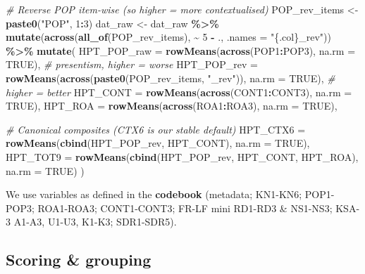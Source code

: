 \documentclass[
  10pt,
]{article}
\newenvironment{Shaded}{\begin{snugshade}}{\end{snugshade}}
\newcommand{\AttributeTok}[1]{\textcolor[rgb]{0.13,0.29,0.53}{#1}}
\newcommand{\CommentTok}[1]{\textcolor[rgb]{0.56,0.35,0.01}{\textit{#1}}}
\newcommand{\ConstantTok}[1]{\textcolor[rgb]{0.56,0.35,0.01}{#1}}
\newcommand{\DecValTok}[1]{\textcolor[rgb]{0.00,0.00,0.81}{#1}}
\newcommand{\FunctionTok}[1]{\textcolor[rgb]{0.13,0.29,0.53}{\textbf{#1}}}
\newcommand{\NormalTok}[1]{#1}
\newcommand{\OtherTok}[1]{\textcolor[rgb]{0.56,0.35,0.01}{#1}}
\newcommand{\SpecialCharTok}[1]{\textcolor[rgb]{0.81,0.36,0.00}{\textbf{#1}}}
\newcommand{\StringTok}[1]{\textcolor[rgb]{0.31,0.60,0.02}{#1}}
\begin{document}
\begin{Shaded}
\begin{Highlighting}[]
\CommentTok{\# Reverse POP item{-}wise (so higher = more contextualised)}
\NormalTok{POP\_rev\_items }\OtherTok{\textless{}{-}} \FunctionTok{paste0}\NormalTok{(}\StringTok{"POP"}\NormalTok{, }\DecValTok{1}\SpecialCharTok{:}\DecValTok{3}\NormalTok{)}
\NormalTok{dat\_raw }\OtherTok{\textless{}{-}}\NormalTok{ dat\_raw }\SpecialCharTok{\%\textgreater{}\%}
  \FunctionTok{mutate}\NormalTok{(}\FunctionTok{across}\NormalTok{(}\FunctionTok{all\_of}\NormalTok{(POP\_rev\_items), }\SpecialCharTok{\textasciitilde{}} \DecValTok{5} \SpecialCharTok{{-}}\NormalTok{ ., }\AttributeTok{.names =} \StringTok{"\{.col\}\_rev"}\NormalTok{)) }\SpecialCharTok{\%\textgreater{}\%}
  \FunctionTok{mutate}\NormalTok{(}
    \AttributeTok{HPT\_POP\_raw =} \FunctionTok{rowMeans}\NormalTok{(}\FunctionTok{across}\NormalTok{(POP1}\SpecialCharTok{:}\NormalTok{POP3), }\AttributeTok{na.rm =} \ConstantTok{TRUE}\NormalTok{),           }\CommentTok{\# presentism, higher = worse}
    \AttributeTok{HPT\_POP\_rev =} \FunctionTok{rowMeans}\NormalTok{(}\FunctionTok{across}\NormalTok{(}\FunctionTok{paste0}\NormalTok{(POP\_rev\_items, }\StringTok{"\_rev"}\NormalTok{)), }\AttributeTok{na.rm =} \ConstantTok{TRUE}\NormalTok{),  }\CommentTok{\# higher = better}
    \AttributeTok{HPT\_CONT    =} \FunctionTok{rowMeans}\NormalTok{(}\FunctionTok{across}\NormalTok{(CONT1}\SpecialCharTok{:}\NormalTok{CONT3), }\AttributeTok{na.rm =} \ConstantTok{TRUE}\NormalTok{),}
    \AttributeTok{HPT\_ROA     =} \FunctionTok{rowMeans}\NormalTok{(}\FunctionTok{across}\NormalTok{(ROA1}\SpecialCharTok{:}\NormalTok{ROA3),   }\AttributeTok{na.rm =} \ConstantTok{TRUE}\NormalTok{),}

    \CommentTok{\# Canonical composites (CTX6 is our stable default)}
    \AttributeTok{HPT\_CTX6 =} \FunctionTok{rowMeans}\NormalTok{(}\FunctionTok{cbind}\NormalTok{(HPT\_POP\_rev, HPT\_CONT), }\AttributeTok{na.rm =} \ConstantTok{TRUE}\NormalTok{),}
    \AttributeTok{HPT\_TOT9 =} \FunctionTok{rowMeans}\NormalTok{(}\FunctionTok{cbind}\NormalTok{(HPT\_POP\_rev, HPT\_CONT, HPT\_ROA), }\AttributeTok{na.rm =} \ConstantTok{TRUE}\NormalTok{)}
\NormalTok{  )}
\end{Highlighting}
\end{Shaded}

We use variables as defined in the \textbf{codebook} (metadata; KN1-KN6;
POP1-POP3; ROA1-ROA3; CONT1-CONT3; FR-LF mini RD1-RD3 \& NS1-NS3; KSA-3
A1-A3, U1-U3, K1-K3; SDR1-SDR5).

\hypertarget{scoring-grouping}{%
\subsection{Scoring \& grouping}\label{scoring-grouping}}
\end{document}
